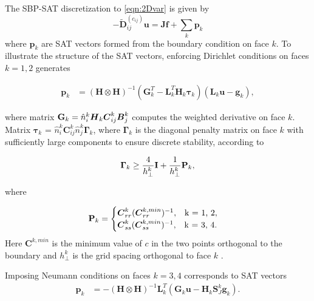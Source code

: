 The SBP-SAT discretization to \autoref{eqn:2Dvar} is given by
\begin{equation}\label{eqn:2Ddiscrete}
    -\tilde{\boldsymbol{D}}_{ij}^{(c_{ij})}\boldsymbol{u} = \boldsymbol{Jf} + \sum_k \boldsymbol{p}_k
\end{equation}
where $\boldsymbol{p}_k$ are SAT vectors formed from the boundary condition on face $k$. To illustrate the structure of the SAT vectors, enforcing Dirichlet conditions on faces $k = 1, 2$ generates 

\begin{align}
\boldsymbol{p}_{k} &= \left(\boldsymbol{H} \otimes \boldsymbol{H}\right)^{-1}\left(\boldsymbol{G}_k^T  - \boldsymbol{L}_k^T \boldsymbol{H}_k {\boldsymbol \tau}_k   \right)\left(\boldsymbol{L}_k\boldsymbol{u} - \boldsymbol{g}_k\right), 
\end{align}


where matrix ${\bf G}_k = \hat{n}_i^k \boldsymbol{H}_k \boldsymbol{C}_{ij}^k \boldsymbol{B}_j^k$ computes the weighted derivative on face $k$. 
Matrix $\boldsymbol{\tau}_k$ = $\hat{n}^k_i \boldsymbol{C}^k_{ij}\hat{n}^k_j{\boldsymbol \Gamma}_k$, where ${\boldsymbol \Gamma}_k$ is the diagonal penalty matrix on face $k$ with sufficiently large components to ensure discrete stability, according to 

\begin{equation}
    {\boldsymbol \Gamma}_k \geq \frac{4}{h_\perp^k}{\bf I} + \frac{1}{h_\perp^k }{\bf P}_k,
\end{equation}

\noindent where 

\begin{equation}\label{eqn:minval}
{\bf P}_k = 
\begin{cases}
{\boldsymbol{C}}^{k}_{rr} ({\boldsymbol{C}}_{rr}^{k, min})^{-1}, \quad $k = 1, 2$,\\
{\boldsymbol{C}}^{k}_{ss} ({\boldsymbol{C}}_{ss}^{k, min})^{-1}, \quad $k = 3, 4$.
\end{cases}
\end{equation}
Here ${\boldsymbol{C}}^{k, min}$ is the minimum value of $c$ in the two points orthogonal to the boundary and $h_\perp^k$ is the grid spacing orthogonal to face $k$ \citep{Erickson2022}. 


Imposing Neumann conditions on faces $k = 3, 4$ corresponds to SAT vectors
\begin{align}
\boldsymbol{p}_{k} &= -\left(\boldsymbol{H} \otimes \boldsymbol{H}\right)^{-1}\boldsymbol{L}^T_k\left(\boldsymbol{G}_k \boldsymbol{u}  - \boldsymbol{H}_k \boldsymbol{S}_J^k \boldsymbol{g}_k\right).  
\end{align}



